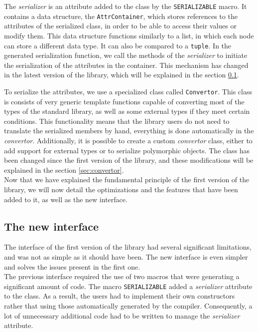 The \textit{serializer} is an attribute added to the class by the
\texttt{SERIALIZABLE} macro. It contains a data structure, the
\texttt{AttrContainer}, which stores references to the attributes of the
serialized class, in order to be able to access their values or modify them.
This data structure functions similarly to a list, in which each node can store
a different data type. It can also be compared to a \texttt{tuple}. In the
generated serialization function, we call the methods of the \textit{serializer}
to initiate the serialization of the attributes in the container. This mechanism
has changed in the latest version of the library, which will be explained in the
section \ref{sec:sernewinterface}.

To serialize the attributes, we use a specialized class called
\texttt{Convertor}. This class is consists of very generic template functions
capable of converting most of the types of the standard library, as well as some
external types if they meet certain conditions. This functionality means that
the library users do not need to translate the serialized members by hand,
everything is done automatically in the \textit{convertor}. Additionally, it is
possible to create a custom \textit{convertor} class, either to add support for
external types or to serialize polymorphic objects. The class has been changed
since the first version of the library, and these modifications will be
explained in the section \ref{sec:convertor}.\\

Now that we have explained the fundamental principle of the first version of the
library, we will now detail the optimizations and the features that have been
added to it, as well as the new interface.

\subsection{The new interface}
\label{sec:sernewinterface}

The interface of the first version of the library had several significant
limitations, and was not as simple as it should have been. The new interface is
even simpler and solves the issues present in the first one.\\

The previous interface required the use of two macros that were generating a
significant amount of code. The macro \texttt{SERIALIZABLE} added a
\textit{serializer} attribute to the class. As a result, the users had to
implement their own constructors rather that using those automatically generated
by the compiler. Consequently, a lot of unnecessary additional code had to be
written to manage the \textit{serializer} attribute.


